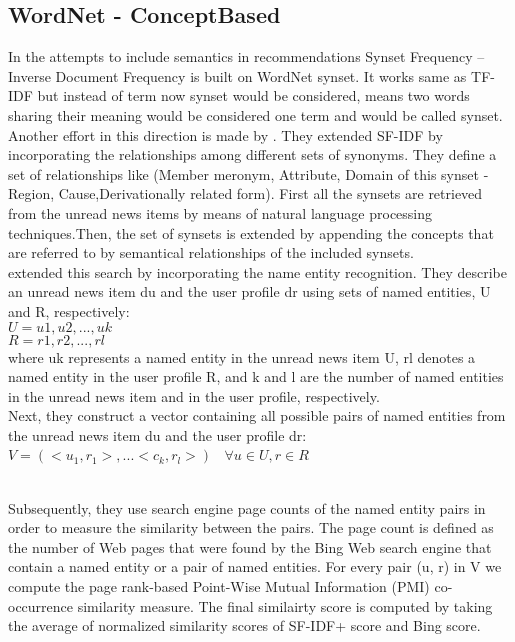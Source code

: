 \subsection{WordNet - ConceptBased}
In the attempts to include semantics in recommendations \cite{SF-IDF} Synset Frequency – Inverse Document Frequency is built on WordNet synset. It works same as TF-IDF but instead of term now synset would be considered, means two words sharing their meaning would be considered one term and would be called synset.
\\Another effort in this direction is made by \cite{SF-IDF+}. They extended SF-IDF by incorporating the relationships among different sets of synonyms. They define a set of relationships like (Member meronym, Attribute, Domain of this synset - Region, Cause,Derivationally related form). First all the synsets are retrieved from the unread news items by means of natural language processing techniques.Then, the set of synsets is extended by appending the concepts that are referred to by semantical relationships of the included synsets.
\\
\cite{bingSF-IDF+} extended this search by incorporating the name entity recognition. They describe an unread news item du and the user profile dr using sets of named entities, U and R, respectively:
\\$U ={u1,u2,...,uk}$ 
\\$R ={r1,r2,...,rl}$
\\
where uk represents a named entity in the unread news item U, rl denotes a named entity in the user profile R, and k and l are the number of named entities in the unread news item and in the user profile, respectively.
\\Next, they construct a vector containing all possible pairs of named entities from the unread news item du and the user profile dr:
\\$V = (<u_1,r_1>,...<c_k,r_l>)\;\;$  $ \forall u \in U, r\in R$

\\Subsequently, they use search engine page counts of the named entity pairs in order to measure the similarity between the pairs. The page count is defined as the number of Web pages that were found by the Bing Web search engine that contain a named entity or a pair of named entities. For every pair (u, r) in V we compute the page rank-based Point-Wise Mutual Information (PMI) co-occurrence similarity measure. The final similairty score is computed by taking the average of normalized similarity scores of SF-IDF+ score and Bing score.

